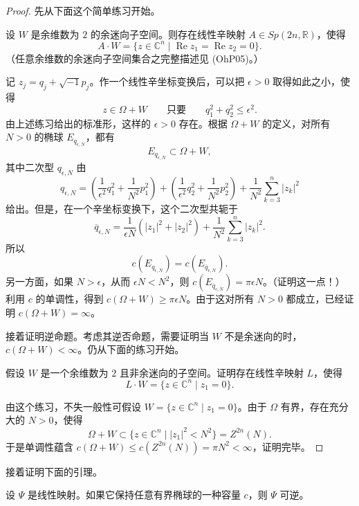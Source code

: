 \begin{proof}
先从下面这个简单练习开始。

\begin{exercise}\label{ex:coisotropic-codim-two-normal-form}
设 $W$ 是余维数为 $2$ 的余迷向子空间。则存在线性辛映射
$A\in Sp(2n,\mathbb R)$，使得
\[
 A\cdot W=\{z\in\mathbb C^n\mid
   \operatorname{Re}z_1=\operatorname{Re}z_2=0\}.
\]
（任意余维数的余迷向子空间集合之完整描述见 (OhP05)。）
\end{exercise}

记 $z_j=q_j+\sqrt{-1}p_j$。作一个线性辛坐标变换后，可以把
$\epsilon>0$ 取得如此之小，使得
\[
 z\in\Omega+W
 \qquad\text{只要}\qquad q_1^2+q_2^2\leq\epsilon^2.
\]
由上述练习给出的标准形，这样的 $\epsilon>0$ 存在。根据
$\Omega+W$ 的定义，对所有 $N>0$ 的椭球 $E_{q_{\epsilon,N}}$，都有
\[
 E_{q_{\epsilon,N}}\subset\Omega+W,
\]
其中二次型 $q_{\epsilon,N}$ 由
\[
 q_{\epsilon,N}
 =\left(\frac1{\epsilon^2}q_1^2+\frac1{N^2}p_1^2\right)
  +\left(\frac1{\epsilon^2}q_2^2+\frac1{N^2}p_2^2\right)
  +\frac1{N^2}\sum_{k=3}^n|z_k|^2
\]
给出。但是，在一个辛坐标变换下，这个二次型共轭于
\[
 \overline q_{\epsilon,N}
 =\frac1{\epsilon N}(|z_1|^2+|z_2|^2)
  +\frac1{N^2}\sum_{k=3}^n|z_k|^2.
\]
所以
\[
 c(E_{q_{\epsilon,N}})=c(E_{\overline q_{\epsilon,N}}).
\]
另一方面，如果 $N>\epsilon$，从而 $\epsilon N<N^2$，则
$c(E_{\overline q_{\epsilon,N}})=\pi\epsilon N$。（证明这一点！）利用
$c$ 的单调性，得到 $c(\Omega+W)\geq\pi\epsilon N$。由于这对所有
$N>0$ 都成立，已经证明 $c(\Omega+W)=\infty$。

接着证明逆命题。考虑其逆否命题，需要证明当 $W$ 不是余迷向的时，
$c(\Omega+W)<\infty$。仍从下面的练习开始。

\begin{exercise}\label{ex:noncoisotropic-codim-two-normal-form}
假设 $W$ 是一个余维数为 $2$ 且非余迷向的子空间。证明存在线性辛映射 $L$，使得
\[
 L\cdot W=\{z\in\mathbb C^n\mid z_1=0\}.
\]
\end{exercise}

由这个练习，不失一般性可假设
$W=\{z\in\mathbb C^n\mid z_1=0\}$。由于 $\Omega$ 有界，存在充分大的 $N>0$，使得
\[
 \Omega+W\subset
 \{z\in\mathbb C^n\mid |z_1|^2<N^2\}=Z^{2n}(N).
\]
于是单调性蕴含
$c(\Omega+W)\leq c(Z^{2n}(N))=\pi N^2<\infty$，证明完毕。
\end{proof}

接着证明下面的引理。

\begin{lemma}\label{lem:capacity-preserving-linear-invertible}
设 $\Psi$ 是线性映射。如果它保持任意有界椭球的一种容量 $c$，则
$\Psi$ 可逆。
\end{lemma}


